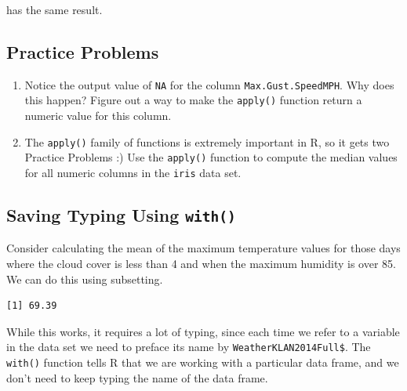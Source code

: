 \documentclass[]{krantz}
\makeatletter
\newenvironment{Shaded}{\begin{snugshade}}{\end{snugshade}}
\newcommand{\KeywordTok}[1]{\textcolor[rgb]{0.27,0.27,0.27}{\textbf{#1}}}
\newcommand{\DecValTok}[1]{\textcolor[rgb]{0.06,0.06,0.06}{#1}}
\newcommand{\StringTok}[1]{\textcolor[rgb]{0.5,0.5,0.5}{#1}}
\newcommand{\OperatorTok}[1]{\textcolor[rgb]{0.43,0.43,0.43}{\textbf{#1}}}
\newcommand{\NormalTok}[1]{#1}
\providecommand{\tightlist}{%
  \setlength{\itemsep}{0pt}\setlength{\parskip}{0pt}}
\newenvironment{kframe}{%
\medskip{}
\setlength{\fboxsep}{.8em}
 \def\at@end@of@kframe{}%
 \ifinner\ifhmode%
  \def\at@end@of@kframe{\end{minipage}}%
  \begin{minipage}{\columnwidth}%
 \fi\fi%
 \def\FrameCommand##1{\hskip\@totalleftmargin \hskip-\fboxsep
 \colorbox{shadecolor}{##1}\hskip-\fboxsep
     \hskip-\linewidth \hskip-\@totalleftmargin \hskip\columnwidth}%
 \MakeFramed {\advance\hsize-\width
   \@totalleftmargin\z@ \linewidth\hsize
   \@setminipage}}%
 {\par\unskip\endMakeFramed%
 \at@end@of@kframe}
\renewenvironment{Shaded}{\begin{kframe}}{\end{kframe}}
\makeatother
\begin{document}
has the same result.

\subsection{Practice Problems}\label{practice-problems}

\begin{enumerate}
\def\labelenumi{\arabic{enumi}.}
\tightlist
\item
  Notice the output value of \texttt{NA} for the column
  \texttt{Max.Gust.SpeedMPH}. Why does this happen? Figure out a way to
  make the \texttt{apply()} function return a numeric value for this
  column.
\item
  The \texttt{apply()} family of functions is extremely important in R,
  so it gets two Practice Problems :) Use the \texttt{apply()} function
  to compute the median values for all numeric columns in the
  \texttt{iris} data set.
\end{enumerate}

\subsection{\texorpdfstring{Saving Typing Using
\texttt{with()}}{Saving Typing Using with()}}\label{saving-typing-using-with}

Consider calculating the mean of the maximum temperature values for
those days where the cloud cover is less than 4 and when the maximum
humidity is over 85. We can do this using subsetting.

\begin{Shaded}
\end{Shaded}

\begin{verbatim}
[1] 69.39
\end{verbatim}

While this works, it requires a lot of typing, since each time we refer
to a variable in the data set we need to preface its name by
\texttt{WeatherKLAN2014Full\$}. The \texttt{with()} function tells R
that we are working with a particular data frame, and we don't need to
keep typing the name of the data frame.
\end{document}
